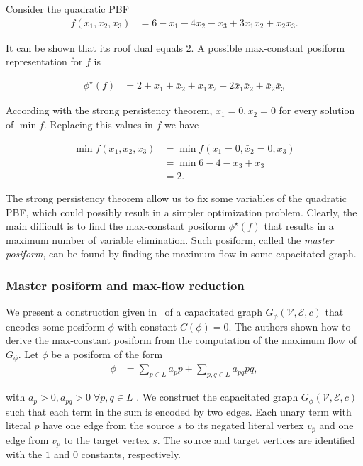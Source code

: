 \begin{example}
Consider the quadratic PBF 
\begin{align*}
	f(x_1,x_2,x_3) &= 6-x_1-4x_2-x_3+3x_1x_2+x_2x_3.
\end{align*}

It can be shown that its roof dual equals $2$. A possible max-constant posiform representation for $f$ is

\begin{align*}
	\phi^{\star}(f) &= 2 + x_1 + \bar{x}_2 + x_1x_2 +2\bar{x}_1\bar{x}_2 + \bar{x}_2\bar{x}_3
\end{align*}

According with the strong persistency theorem, $x_1=0,\bar{x}_2=0$ for every solution of $\min f$. Replacing this values in $f$ we have

\begin{align*}
	\min f(x_1,x_2,x_3) &=\min f(x_1=0,\bar{x}_2=0,x_3) \\
	&= \min 6 - 4 - x_3 + x_3 \\
	&= 2.
\end{align*}
\end{example}

The strong persistency theorem allow us to fix some variables of the quadratic PBF, which could possibly result in a simpler optimization problem. Clearly, the main difficult is to find the max-constant posiform $\phi^{\star}(f)$ that results in a maximum number of variable elimination. Such posiform, called the \emph{master posiform}, can be found by finding the maximum flow in some capacitated graph.

\subsubsection{Master posiform and max-flow reduction}

We present a construction given in~\cite{boros91,boros02pseudo} of a capacitated graph $G_{\phi}(\mathcal{V},\mathcal{E},c)$ that encodes some posiform $\phi$ with constant $C(\phi)=0$. The authors shown how to derive the max-constant posiform from the computation of the maximum flow of $G_{\phi}$. Let $\phi$ be a posiform of the form
	\begin{align*}
		\phi &= \sum_{p \in L}{a_pp} + \sum_{p,q \in L}{a_{pq}pq},
	\end{align*}
	
with $a_p >0, a_{pq}>0\; \forall p,q \in L$	. We  construct the capacitated graph $G_{\phi}(\mathcal{V},\mathcal{E},c)$ such that each term in the sum is encoded by two edges. Each unary term with literal $p$ have one edge from the source $s$ to its negated literal vertex $v_{\bar{p}}$ and one edge from $v_p$ to the target vertex $\bar{s}$. The source and target vertices are identified with the $1$ and $0$ constants, respectively. 

